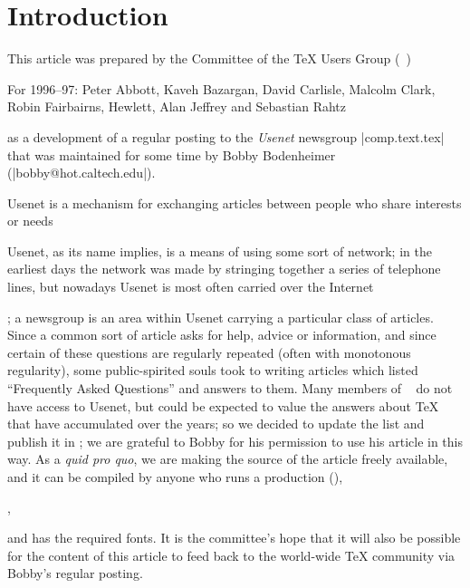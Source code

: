 \def\fileversion{2.0i}    \def\filedate{1997/01/02}
%
%
\ifnotreadCTAN
%
%
  
%
  
%
  \notreadCTANfalse
\fi

\section{Introduction}

This article was prepared by the Committee of the  \TeX{} Users
Group (~)\begin{footnoteenv}
  For 1996--97: Peter Abbott, Kaveh Bazargan, David Carlisle, Malcolm
  Clark, Robin Fairbairns, Hewlett, Alan Jeffrey and Sebastian
  Rahtz
\end{footnoteenv}
as a development of a regular posting to the \emph{Usenet} newsgroup
\Newsgroup|comp.text.tex| that was maintained for some time by
Bobby Bodenheimer (\Email|bobby@hot.caltech.edu|).

Usenet is a mechanism for exchanging articles between people who share
interests or needs\begin{footnoteenv}
Usenet, as its name implies, is a means of using some sort of network;
in the earliest days the network was made by stringing together a
series of telephone lines, but nowadays Usenet is most often carried
over the Internet
\end{footnoteenv};
a newsgroup is an area within Usenet carrying a particular
class of articles.  Since a common sort of article asks for help,
advice or information, and since certain of these questions are
regularly repeated (often with monotonous regularity), some
public-spirited souls took to writing articles which listed
``Frequently Asked Questions'' and answers to them.  Many members
of ~ do not have access to Usenet, but could be expected to value
the answers about \TeX{} that have accumulated over the years; so we
decided to update the list and publish it in \BV{}; we are
grateful to Bobby for his permission to use his article in this way.
As a \emph{quid pro quo}, we are making the source of the article
freely available, and it can be compiled by anyone who runs a
production
\htmlignore
\LaTeXe{} (),
\endhtmlignore
\begin{htmlversion}
  ,
\end{htmlversion}
and has the required fonts.
It is the committee's hope that it will also be possible for the
content of this article to feed back to the world-wide \TeX{}
community via Bobby's regular posting.

